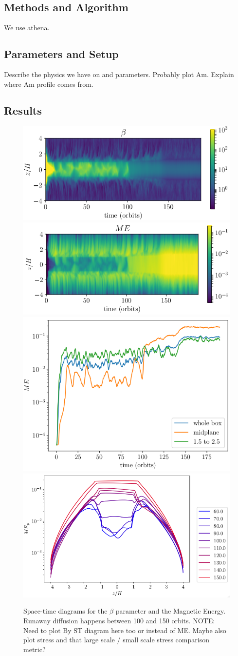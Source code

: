 \subsection{Methods and Algorithm}
We use athena.


\subsection{Parameters and Setup}
Describe the physics we have on and parameters.  Probably plot Am. Explain where Am profile comes from.


\subsection{Results}
\begin{figure}[p]
\centering
\includegraphics[width=0.49\columnwidth]{figs/figsChapter5/3D/Beta_st.png}
\includegraphics[width=0.49\columnwidth]{figs/figsChapter5/3D/ME_st.png}
\includegraphics[width=0.44\columnwidth]{figs/figsChapter5/3D/ME_vs_time.png}
\includegraphics[width=0.55\columnwidth]{figs/figsChapter5/3D/MEy_profile.png}
\caption{Space-time diagrams for the $\beta$ parameter and the Magnetic Energy.  Runaway diffusion happens between 100 and 150 orbits.  NOTE: Need to plot By ST diagram here too or instead of ME.  Maybe also plot stress and that large scale / small scale stress comparison metric?}
\label{3dPlots}
\end{figure}

